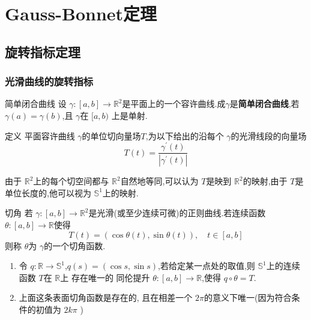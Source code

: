 \documentclass[../../几何与拓扑.tex]{subfiles}
\begin{document}
    
\ifSubfilesClassLoaded{
    \frontmatter

    \tableofcontents
    
    \mainmatter
}{}

\chapter{Gauss-Bonnet定理}


\section{旋转指标定理}
\subsection{光滑曲线的旋转指标}
\begin{definition}{简单闭合曲线}
    设 \(   \gamma   :\left[ a,b \right]\to \mathbb{R} ^{2} \)是平面上的一个容许曲线.成\(   \gamma   \)是\textbf{简单闭合曲线},若 \(   \gamma \left( a \right)=  \gamma \left( b \right)    \),且 \(   \gamma   \)在 \(  [a,b)  \)     上是单射.
\end{definition}

\begin{definition}
    定义 平面容许曲线 \(   \gamma   \)的单位切向量场\(  T  \),为以下给出的沿每个 \(   \gamma   \)的光滑线段的向量场  \[
    T\left( t \right)= \frac{ \gamma ^{\prime} \left( t \right)  }{\left|  \gamma ^{\prime} \left( t \right)  \right|  }  
    \]  
\end{definition}

\begin{remark}
    由于 \(  \mathbb{R} ^{2}  \)上的每个切空间都与 \(  \mathbb{R} ^{2}  \)自然地等同,可以认为 \(  T  \)是映到 \(  \mathbb{R} ^{2}  \)的映射,由于 \(  T  \)是单位长度的,他可以视为 \(  \mathbb{S}^{1}  \)上的映射.      
\end{remark}


\begin{definition}{切角}
    若 \(   \gamma :\left[ a,b \right]\to \mathbb{R} ^{2}   \)是光滑(或至少连续可微)的正则曲线.若连续函数 \(   \theta :\left[ a,b \right]\to \mathbb{R}    \)使得 \[
    T\left( t \right)= \left( \cos  \theta \left( t \right),\sin  \theta \left( t \right)   \right),\quad t\in \left[ a,b \right]   
    \]  则称 \(   \theta   \)为 \(   \gamma   \)的一个切角函数.  
\end{definition}

\begin{remark}
    \begin{enumerate}
        \item 令 \(  q:\mathbb{R} \to \mathbb{S}^{1}  \),\(  q\left( s \right)= \left( \cos s,\sin s \right)    \),若给定某一点处的取值,则 \(  \mathbb{S}^{1}  \)上的连续函数 \(  T  \)在 \(  \mathbb{R}   \)上  存在唯一的   同伦提升 \(   \theta :\left[ a,b \right]\to \mathbb{R}    \),使得 \(  q\circ  \theta = T  \).
        \item 上面这条表面切角函数是存在的,  且在相差一个 \(  2\pi   \)的意义下唯一(因为符合条件的初值为 \(  2k\pi   \) ) 
    \end{enumerate}
    
\end{remark}
\end{document}

